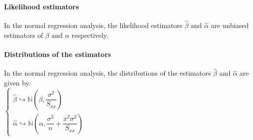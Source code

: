\paragraph{Likelihood estimators}
In the normal regression analysis, the likelihood estimators 
$\hat{\beta}\text{ and }\hat{\alpha}$ are unbiased estimators of
$\beta\text{ and }\alpha$ respectively.

\paragraph{Distributions of the estimators}
In the normal regression analysis, the distributions of the estimators
$\hat{\beta}$ and $\hat{\alpha}$ are given by:\\
$
\begin{cases}
	\hat{\beta}\hookrightarrow \mathbb{N}\left(\beta,\dfrac{\sigma^{2}}{S_{xx}}\right)\\
	\hat{\alpha}\hookrightarrow \mathbb{N}\left(\alpha,\dfrac{\sigma^{2}}{n}+\dfrac{\overline{x}^{2}\sigma^{2}}{S_{xx}}\right)
\end{cases}
$
